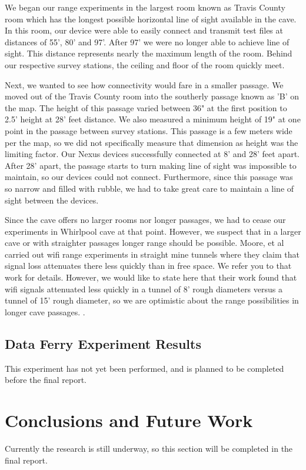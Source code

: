\documentclass[10pt,twocolumn]{article}
\begin{document}
We began our range experiments in the largest room known as Travis County room which has the longest possible horizontal line of sight available in the cave.
In this room, our device were able to easily connect and transmit test files at distances of 55', 80' and 97'. 
After 97' we were no longer able to achieve line of sight.
This distance represents nearly the maximum length of the room. 
Behind our respective survey stations, the ceiling and floor of the room quickly meet.

Next, we wanted to see how connectivity would fare in a smaller passage. 
We moved out of the Travis County room into the southerly passage known as 'B' on the map.
The height of this passage varied between 36" at the first position to 2.5' height at 28' feet distance.
We also measured a minimum height of 19" at one point in the passage between survey stations.
This passage is a few meters wide per the map, so we did not specifically measure that dimension as height was the limiting factor.
Our Nexus devices successfully connected at 8' and 28' feet apart.
After 28' apart, the passage starts to turn making line of sight was impossible to maintain, so our devices could not connect.
Furthermore, since this passage was so narrow and filled with rubble, we had to take great care to maintain a line of sight between the devices.

Since the cave offers no larger rooms nor longer passages, we had to cease our experiments in Whirlpool cave at that point.
However, we suspect that in a larger cave or with straighter passages longer range should be possible.
Moore, et al carried out wifi range experiments in straight mine tunnels where they claim that signal loss attenuates there less quickly than in free space.
We refer you to that work for details.
However, we would like to state here that their work found that wifi signals attenuated less quickly in a tunnel of 8' rough diameters versus a tunnel of 15' rough diameter, so we are optimistic about the range possibilities in longer cave passages. \cite{moore2012}.


\subsection{Data Ferry Experiment Results}
This experiment has not yet been performed, and is planned to be completed before the final report.

\section{Conclusions and Future Work}
Currently the research is still underway, so this section will be completed in the final report.
\end{document}
